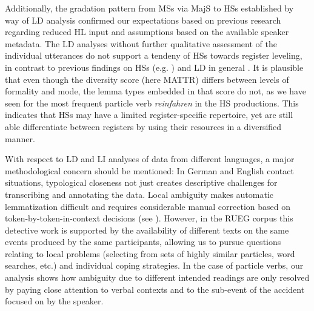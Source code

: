 \documentclass[output=paper,colorlinks,citecolor=brown]{langscibook}
\begin{document}
Additionally, the gradation pattern from MSs via MajS to HSs established by way of LD analysis confirmed our expectations based on previous research regarding reduced HL input and assumptions based on the available speaker metadata. The LD analyses without further qualitative assessment of the individual utterances do not support a tendeny of HSs towards register leveling, in contrast to previous findings on HSs (e.g. \citealt{WieseEtAl2022}) and LD in general \citep{VanGijselSpeelmanGeeraerts2005Richness, Yu2009LDWritingSpeaking, Alamillo2019LexicalSkills}. It is plausible that even though the diversity score (here MATTR) differs between levels of formality and mode, the lemma types embedded in that score do not, as we have seen for the most frequent particle verb \textit{reinfahren} in the HS productions. This indicates that HSs may have a limited register-specific repertoire, yet are still able differentiate between registers by using their resources in a diversified manner.

With respect to LD and LI analyses of data from different languages, a major methodological concern should be mentioned: In German and English contact situations, typological closeness not just creates descriptive challenges for transcribing and annotating the data. Local ambiguity makes automatic lemmatization difficult and requires considerable manual correction based on token-by-token-in-context decisions (see \cite{chapters/02}). However, in the RUEG corpus this detective work is supported by the availability of different texts on the same events produced by the same participants, allowing us to pursue questions relating to local problems (selecting from sets of highly similar particles, word searches, etc.) and individual coping strategies. In the case of particle verbs, our analysis shows how ambiguity due to different intended readings are only resolved by paying close attention to verbal contexts and to the sub-event of the accident focused on by the speaker.
\end{document}
